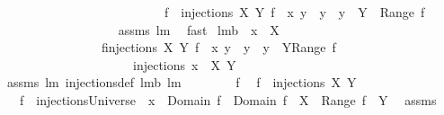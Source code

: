 \begin{isabellebody}
\ \ \ \ \ \ \ \ \ \ \ \ \ \ \ \ \ \ \ \ \ \ \ \ \ {\isacharparenleft}{\isasymUnion}\ f\ {\isasymin}\ injections\ X\ Y{\isachardot}\ {\isacharbraceleft}f\ {\isasymunion}\ {\isacharbraceleft}{\isacharparenleft}x{\isacharcomma}\ y{\isacharparenright}{\isacharbraceright}\ {\isacharbar}\ y\ {\isachardot}\ y\ {\isasymin}\ Y\ {\isacharminus}\ {\isacharparenleft}Range\ f{\isacharparenright}{\isacharbraceright}{\isacharparenright}{\isachardoublequoteclose}\isanewline
%
\isadelimproof
\ \ \ \ \ \ \ \ \ \ \ \ \ \ \ \ \ %
\endisadelimproof
%
\isatagproof
{}\isamarkupfalse%
\ assms\ lm{}{}\ \isamarkupfalse%
\ fast%
\endisatagproof
{\isafoldproof}%
%
\isadelimproof
\isanewline
%
\endisadelimproof
\isanewline
{}\isamarkupfalse%
\ lm{}{}b{\isacharcolon}\ \ {\isachardoublequoteopen}x\ {\isasymnotin}\ X{\isachardoublequoteclose}\ \isanewline
\ \ \ \ \ \ \ \ \ \ \ \ \ \ \ {\isachardoublequoteopen}{\isacharparenleft}{\isasymUnion}\ f{\isasymin}injections{\isacharprime}\ X\ Y{\isachardot}\ {\isacharbraceleft}f\ {\isasymunion}\ {\isacharbraceleft}{\isacharparenleft}x{\isacharcomma}\ y{\isacharparenright}{\isacharbraceright}\ {\isacharbar}\ y\ {\isachardot}\ y\ {\isasymin}\ Y{\isacharminus}Range\ f{\isacharbraceright}{\isacharparenright}\ {\isasymsubseteq}\ \isanewline
\ \ \ \ \ \ \ \ \ \ \ \ \ \ \ \ \ \ \ \ \ injections{\isacharprime}\ {\isacharparenleft}{\isacharbraceleft}x{\isacharbraceright}\ {\isasymunion}\ X{\isacharparenright}\ Y{\isachardoublequoteclose}\ \isanewline
%
\isadelimproof
\ \ \ \ \ \ \ \ \ \ \ \ \ %
\endisadelimproof
%
\isatagproof
{}\isamarkupfalse%
\ assms\ lm{}{}\ injections{\isacharunderscore}def\ lm{}{}b\ lm{}{}\ \isanewline
{}\isamarkupfalse%
\ {\isacharminus}\isanewline
\ \ \isacommand{{\isacharbraceleft}}\isamarkupfalse%
\ \isamarkupfalse%
\ f\ \isamarkupfalse%
\ {\isachardoublequoteopen}f\ {\isasymin}\ injections{\isacharprime}\ X\ Y{\isachardoublequoteclose}\ \isamarkupfalse%
\ \isamarkupfalse%
\ \isanewline
\ \ {}{\isacharcolon}\ {\isachardoublequoteopen}f\ {\isasymin}\ injectionsUniverse\ {\isacharampersand}\ x\ {\isasymnotin}\ Domain\ f\ {\isacharampersand}\ Domain\ f\ {\isacharequal}\ X\ {\isacharampersand}\ Range\ f\ {\isasymsubseteq}\ Y{\isachardoublequoteclose}\ \isamarkupfalse%
\ assms\ \isamarkupfalse%

\end{isabellebody}
